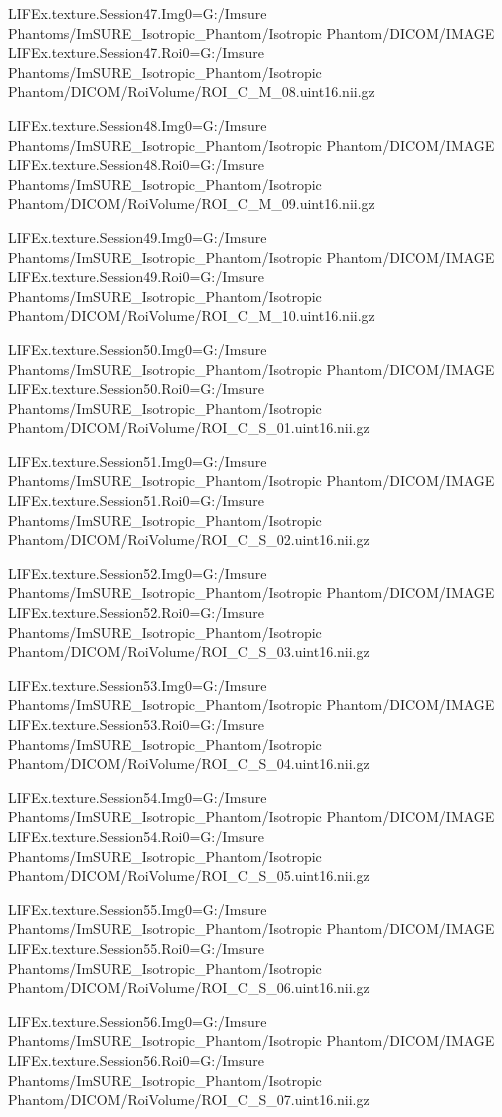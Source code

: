 LIFEx.texture.Session47.Img0=G:/Imsure Phantoms/ImSURE_Isotropic_Phantom/Isotropic Phantom/DICOM/IMAGE
LIFEx.texture.Session47.Roi0=G:/Imsure Phantoms/ImSURE_Isotropic_Phantom/Isotropic Phantom/DICOM/RoiVolume/ROI_C_M_08.uint16.nii.gz

LIFEx.texture.Session48.Img0=G:/Imsure Phantoms/ImSURE_Isotropic_Phantom/Isotropic Phantom/DICOM/IMAGE
LIFEx.texture.Session48.Roi0=G:/Imsure Phantoms/ImSURE_Isotropic_Phantom/Isotropic Phantom/DICOM/RoiVolume/ROI_C_M_09.uint16.nii.gz

LIFEx.texture.Session49.Img0=G:/Imsure Phantoms/ImSURE_Isotropic_Phantom/Isotropic Phantom/DICOM/IMAGE
LIFEx.texture.Session49.Roi0=G:/Imsure Phantoms/ImSURE_Isotropic_Phantom/Isotropic Phantom/DICOM/RoiVolume/ROI_C_M_10.uint16.nii.gz

LIFEx.texture.Session50.Img0=G:/Imsure Phantoms/ImSURE_Isotropic_Phantom/Isotropic Phantom/DICOM/IMAGE
LIFEx.texture.Session50.Roi0=G:/Imsure Phantoms/ImSURE_Isotropic_Phantom/Isotropic Phantom/DICOM/RoiVolume/ROI_C_S_01.uint16.nii.gz

LIFEx.texture.Session51.Img0=G:/Imsure Phantoms/ImSURE_Isotropic_Phantom/Isotropic Phantom/DICOM/IMAGE
LIFEx.texture.Session51.Roi0=G:/Imsure Phantoms/ImSURE_Isotropic_Phantom/Isotropic Phantom/DICOM/RoiVolume/ROI_C_S_02.uint16.nii.gz

LIFEx.texture.Session52.Img0=G:/Imsure Phantoms/ImSURE_Isotropic_Phantom/Isotropic Phantom/DICOM/IMAGE
LIFEx.texture.Session52.Roi0=G:/Imsure Phantoms/ImSURE_Isotropic_Phantom/Isotropic Phantom/DICOM/RoiVolume/ROI_C_S_03.uint16.nii.gz

LIFEx.texture.Session53.Img0=G:/Imsure Phantoms/ImSURE_Isotropic_Phantom/Isotropic Phantom/DICOM/IMAGE
LIFEx.texture.Session53.Roi0=G:/Imsure Phantoms/ImSURE_Isotropic_Phantom/Isotropic Phantom/DICOM/RoiVolume/ROI_C_S_04.uint16.nii.gz

LIFEx.texture.Session54.Img0=G:/Imsure Phantoms/ImSURE_Isotropic_Phantom/Isotropic Phantom/DICOM/IMAGE
LIFEx.texture.Session54.Roi0=G:/Imsure Phantoms/ImSURE_Isotropic_Phantom/Isotropic Phantom/DICOM/RoiVolume/ROI_C_S_05.uint16.nii.gz

LIFEx.texture.Session55.Img0=G:/Imsure Phantoms/ImSURE_Isotropic_Phantom/Isotropic Phantom/DICOM/IMAGE
LIFEx.texture.Session55.Roi0=G:/Imsure Phantoms/ImSURE_Isotropic_Phantom/Isotropic Phantom/DICOM/RoiVolume/ROI_C_S_06.uint16.nii.gz

LIFEx.texture.Session56.Img0=G:/Imsure Phantoms/ImSURE_Isotropic_Phantom/Isotropic Phantom/DICOM/IMAGE
LIFEx.texture.Session56.Roi0=G:/Imsure Phantoms/ImSURE_Isotropic_Phantom/Isotropic Phantom/DICOM/RoiVolume/ROI_C_S_07.uint16.nii.gz

